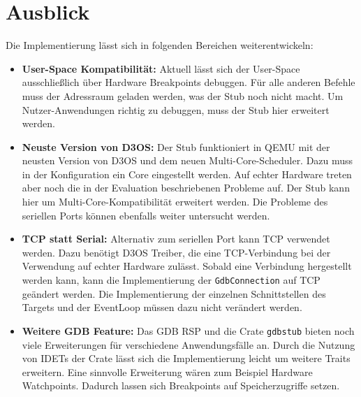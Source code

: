 \section{Ausblick}
Die Implementierung lässt sich in folgenden Bereichen weiterentwickeln:
\begin{itemize}
\item \textbf{User-Space Kompatibilität:} Aktuell lässt sich der User-Space ausschließlich über Hardware Breakpoints debuggen. Für alle anderen Befehle muss der Adressraum geladen werden, was der Stub noch nicht macht. Um Nutzer-Anwendungen richtig zu debuggen, muss der Stub hier erweitert werden.
\item \textbf{Neuste Version von D3OS:} Der Stub funktioniert in QEMU mit der neusten Version von D3OS und dem neuen Multi-Core-Scheduler. Dazu muss in der Konfiguration ein Core eingestellt werden. Auf echter Hardware treten aber noch die in der Evaluation beschriebenen Probleme auf.  Der Stub kann hier um Multi-Core-Kompatibilität erweitert werden. Die Probleme des seriellen Ports können ebenfalls weiter untersucht werden.
\item \textbf{TCP statt Serial:} Alternativ zum seriellen Port kann TCP verwendet werden. Dazu benötigt D3OS Treiber, die eine TCP-Verbindung bei der Verwendung auf echter Hardware zulässt. Sobald eine Verbindung hergestellt werden kann, kann die Implementierung der \texttt{GdbConnection} auf TCP geändert werden. Die Implementierung der einzelnen Schnittstellen des Targets und der EventLoop müssen dazu nicht verändert werden.
\item \textbf{Weitere GDB Feature:} Das GDB RSP und die Crate \texttt{gdbstub} bieten noch viele Erweiterungen für verschiedene Anwendungsfälle an. Durch die Nutzung von IDETs der Crate lässt sich die Implementierung leicht um weitere Traits erweitern. Eine sinnvolle Erweiterung wären zum Beispiel Hardware Watchpoints. Dadurch lassen sich Breakpoints auf Speicherzugriffe setzen.
\end{itemize}
